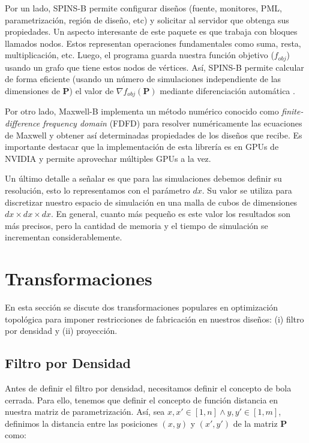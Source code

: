 Por un lado, SPINS-B permite configurar diseños (fuente, monitores, PML, parametrización, región de diseño, etc) y solicitar al servidor que obtenga sus propiedades.
Un aspecto interesante de este paquete es que trabaja con bloques llamados nodos.
Estos representan operaciones fundamentales como suma, resta, multiplicación, etc.
Luego, el programa guarda nuestra función objetivo ($f_{obj}$) usando un grafo que tiene estos nodos de vértices.
Así, SPINS-B permite calcular de forma eficiente
(usando un número de simulaciones independiente de las dimensiones de $\boldsymbol{P}$) 
el valor de $\nabla f_{obj}(\boldsymbol{P})$ mediante diferenciación automática \citep{Su2020, Mykel2019}.

Por otro lado, Maxwell-B implementa un método numérico conocido como \emph{finite-difference frequency domain}
(FDFD) para resolver numéricamente las ecuaciones de Maxwell y obtener así determinadas propiedades
de los diseños que recibe.
Es importante destacar que la implementación de esta librería es en GPUs de NVIDIA y permite
aprovechar múltiples GPUs a la vez.


Un último detalle a señalar es que para las simulaciones debemos definir su resolución,
esto lo representamos con el parámetro $dx$. 
Su valor se utiliza para discretizar nuestro espacio de
simulación en una malla de cubos de dimensiones $dx \times dx \times dx$.
En general, cuanto más pequeño es este valor
los resultados son más precisos, pero la cantidad de memoria y el tiempo de
simulación se incrementan considerablemente.

\section{Transformaciones}\label{sec:transformations}

En esta sección se discute dos transformaciones populares en optimización topológica
para imponer restricciones de fabricación en nuestros diseños: (i) filtro por densidad y
(ii) proyección.

\subsection{Filtro por Densidad}

Antes de definir el filtro por densidad, necesitamos definir el concepto de bola cerrada.
Para ello, tenemos que definir el concepto de función distancia en nuestra matriz
de parametrización. Así, sea $x, x' \in [1, n] \land y, y' \in [1, m]$, definimos 
la distancia entre las posiciones $(x, y)$ y $(x', y')$ de la matriz $\boldsymbol{P}$ como:

